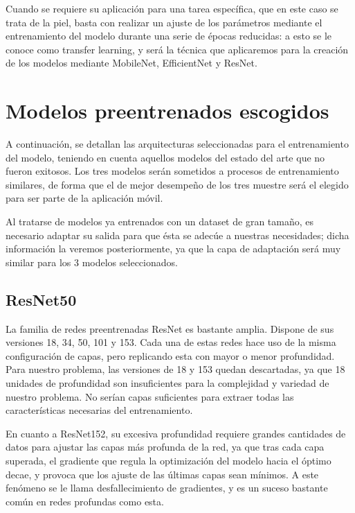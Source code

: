 Cuando se requiere su aplicación para una tarea específica, que en este caso se trata de la piel, basta con realizar un ajuste de los parámetros mediante el entrenamiento del modelo durante una serie de épocas reducidas: a esto se le conoce como transfer learning, y será la técnica que aplicaremos para la creación de los modelos mediante MobileNet, EfficientNet y ResNet.

\section{Modelos preentrenados escogidos}

A continuación, se detallan las arquitecturas seleccionadas para el entrenamiento del modelo, teniendo en cuenta aquellos modelos del estado del arte que no fueron exitosos. Los tres modelos serán sometidos a procesos de entrenamiento similares, de forma que el de mejor desempeño de los tres muestre será el elegido para ser parte de la aplicación móvil.

Al tratarse de modelos ya entrenados con un dataset de gran tamaño, es necesario adaptar su salida para que ésta se adecúe a nuestras necesidades; dicha información la veremos posteriormente, ya que la capa de adaptación será muy similar para los 3 modelos seleccionados.

\subsection{ResNet50}

La familia de redes preentrenadas ResNet \cite{he2015deep} es bastante amplia. Dispone de sus versiones 18, 34, 50, 101 y 153. Cada una de estas redes hace uso de la misma configuración de capas, pero replicando esta con mayor o menor profundidad. Para nuestro problema, las versiones de 18 y 153 quedan descartadas, ya que 18 unidades de profundidad son insuficientes para la complejidad y variedad de nuestro problema. No serían capas suficientes para extraer todas las características necesarias del entrenamiento.

En cuanto a ResNet152, su excesiva profundidad requiere grandes cantidades de datos para ajustar las capas más profunda de la red, ya que tras cada capa superada, el gradiente que regula la optimización del modelo hacia el óptimo decae, y provoca que los ajuste de las últimas capas sean mínimos. A este fenómeno se le llama desfallecimiento de gradientes, y es un suceso bastante común en redes profundas como esta.

